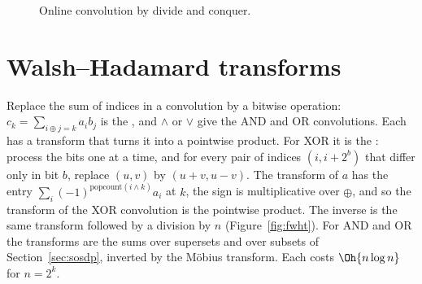 \begin{figure}[htbp]
\centering
{}
\caption{Online convolution by divide and conquer.}
\label{fig:onlineconv}
\end{figure}

\section[Walsh--Hadamard transforms]{Walsh--Hadamard transforms \hfill \ioi}\label{sec:fwht}

Replace the sum of indices in a convolution by a bitwise operation: $c_k = \sum_{i \oplus j = k} a_i b_j$ is the , and $\land$ or $\lor$ give the AND and OR convolutions. Each has a transform that turns it into a pointwise product.
For XOR it is the : process the bits one at a time, and for every pair of indices $(i, i + 2^b)$ that
differ only in bit $b$, replace $(u, v)$ by $(u + v, u - v)$. The transform of $a$ has the entry $\sum_i (-1)^{\mathrm{popcount}(i \land
k)} a_i$ at $k$, the sign is multiplicative over $\oplus$, and so the transform of the XOR convolution is the pointwise product. The
inverse is the same transform followed by a division by $n$ (Figure~\ref{fig:fwht}). For AND and OR the transforms are the sums over
supersets and over subsets of Section~\ref{sec:sosdp}, inverted by the M\"obius transform. Each costs $\Oh{n \log n}$ for $n = 2^k$.

